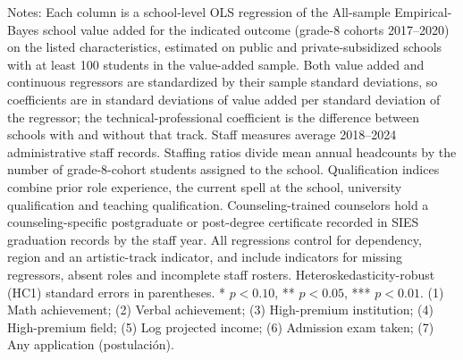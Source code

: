 \begin{table}[!htbp]
\begin{minipage}{\textwidth}
Notes: Each column is a school-level OLS regression of the All-sample Empirical-Bayes school value added for the indicated outcome (grade-8 cohorts 2017--2020) on the listed characteristics, estimated on public and private-subsidized schools with at least 100 students in the value-added sample. Both value added and continuous regressors are standardized by their sample standard deviations, so coefficients are in standard deviations of value added per standard deviation of the regressor; the technical-professional coefficient is the difference between schools with and without that track. Staff measures average 2018--2024 administrative staff records. Staffing ratios divide mean annual headcounts by the number of grade-8-cohort students assigned to the school. Qualification indices combine prior role experience, the current spell at the school, university qualification and teaching qualification. Counseling-trained counselors hold a counseling-specific postgraduate or post-degree certificate recorded in SIES graduation records by the staff year. All regressions control for dependency, region and an artistic-track indicator, and include indicators for missing regressors, absent roles and incomplete staff rosters. Heteroskedasticity-robust (HC1) standard errors in parentheses. * $p<0.10$, ** $p<0.05$, *** $p<0.01$. (1) Math achievement; (2) Verbal achievement; (3) High-premium institution; (4) High-premium field; (5) Log projected income; (6) Admission exam taken; (7) Any application (postulaci\'on).
\end{minipage}
\end{table}
